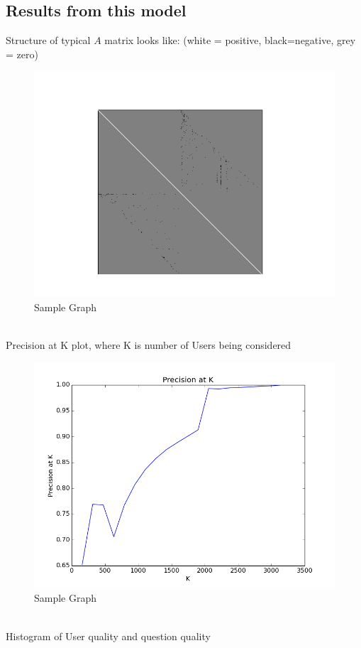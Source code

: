 \documentclass{article}
\begin{document}
\subsection{Results from this model}
Structure of typical $A$ matrix looks like: (white = positive, black=negative, grey = zero)
\begin{figure}[h]
\centering
\includegraphics[width=12cm]{result_LS/hintonAmat.png}
\caption{Sample Graph}
\label{fig1:overview}
\end{figure}
\\
Precision at K plot, where K is number of Users being considered
\begin{figure}[h]
\centering
\includegraphics[width=12cm]{result_LS/PatK.png}
\caption{Sample Graph}
\label{fig1:overview}
\end{figure}
\\
Histogram of User quality and question quality
\end{document}
